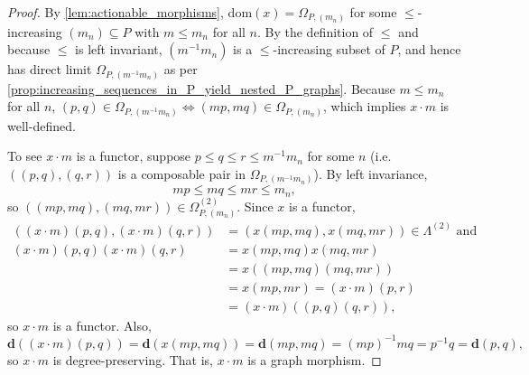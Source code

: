 \documentclass[10pt,a4paper]{amsart}
\newcommand{\RPA}[2]{#1 \cdot #2}
\newcommand{\composablepairs}[1]{#1^{(2)}}
\newcommand{\degree}{\mathbf{d}}
\newcommand{\morphdom}[1]{\mathrm{dom}(#1)}
\begin{document}
\begin{proof}
By \cref{lem:actionable_morphisms}, $\morphdom{x} = \Omega_{P, (m_n)}$ for some $\leq$-increasing $(m_n) \subseteq P$ with $m \leq m_n$ for all $n$.
By the definition of $\leq$ and because $\leq$ is left invariant, $(m^{-1}m_n)$ is a $\leq$-increasing subset of $P$, and hence has direct limit $\Omega_{P, (m^{-1}m_n)}$ as per \cref{prop:increasing_sequences_in_P_yield_nested_P_graphs}. 
Because $m \leq m_n$ for all $n$, $(p, q) \in \Omega_{P, (m^{-1}m_n)} \iff (mp, mq) \in \Omega_{P, (m_n)}$, which implies $\RPA{x}{m}$ is well-defined.

To see $\RPA{x}{m}$ is a functor, suppose $p \leq q \leq r \leq m^{-1}m_n$ for some $n$ (i.e. $((p, q), (q, r))$ is a composable pair in $\Omega_{P, (m^{-1}m_n)}$). 
By left invariance, 
\[
mp \leq mq \leq mr \leq m_n,
\] 
so $((mp, mq), (mq, mr)) \in \composablepairs{\Omega_{P, (m_n)}}$. 
Since $x$ is a functor, 
\begin{align*}
((\RPA{x}{m})(p, q), (\RPA{x}{m})(q, r)) 
&= (x(mp, mq), x(mq, mr)) \in \composablepairs{\Lambda} 
\text{ and } \\
(\RPA{x}{m})(p, q)(\RPA{x}{m})(q, r) 
&= x(mp, mq)x(mq, mr) \\ 
&= x((mp, mq)(mq, mr)) \\ 
&= x(mp, mr) = (\RPA{x}{m})(p, r) \\
&= (\RPA{x}{m})((p, q)(q, r)),
\end{align*} 
so $\RPA{x}{m}$ is a functor.
Also, 
\[
\degree((\RPA{x}{m})(p, q)) 
= \degree(x(mp, mq)) 
= \degree(mp, mq) 
= (mp)^{-1}mq 
= p^{-1}q 
= \degree(p, q),
\] 
so $\RPA{x}{m}$ is degree-preserving. 
That is, $\RPA{x}{m}$ is a graph morphism.
\end{proof}
\end{document}
